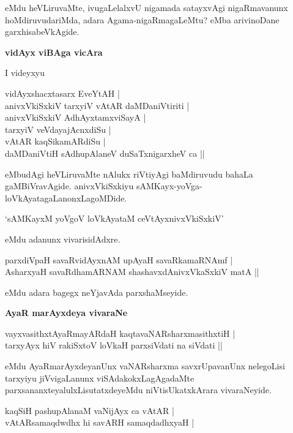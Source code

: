 \noindent
eMdu heVLiruvaMte, ivugaLelalxvU nigamada satayxvAgi nigaRmavanunx hoMdiruvudariMda, adara Agama-nigaRmagaLeMtu? eMba arivinoDane garxhisabeVkAgide.

\newpage

{\bigskip
\noindent
{\large\bf vidAyx viBAga vicAra}}\label{page89a}
\medskip

\noindent
I videyxyu 

\begin{shloka}
vidAyxshacxtasarx EveYtAH |\\
anivxVkiSxkiV tarxyiV vAtAR daMDaniVtiriti |\\
anivxVkiSxkiV AdhAyxtamxviSayA |\\\label{89}
tarxyiV veVdayajAcnxdiSu |\\
vAtAR kaqSikamARdiSu |\\
daMDaniVtiH sAdhupAlaneV duSaTxnigarxheV ca ||
\end{shloka}

\noindent
eMbudAgi heVLiruvaMte nAlukx riVtiyAgi baMdiruvudu bahaLa gaMBiVravAgide. anivxVkiSxkiyu sAMKayx-yoVga-loVkAyatagaLanonxLagoMDide.

\begin{shloka}
`sAMKayxM yoVgoV loVkAyataM ceVtAyxnivxVkiSxkiV'\label{89a}
\end{shloka}

\noindent
eMdu adanunx vivarisidAdxre.

\begin{shloka}
parxdiVpaH savaRvidAyxnAM upAyaH savaRkamaRNAmf |\\\label{89b}
AsharxyaH savaRdhamARNAM shashavxdAnivxVkaSxkiV matA ||
\end{shloka}

\noindent
eMdu adara bagegx neYjavAda parxshaMseyide.

{\bigskip
\noindent
{\large\bf AyaR marAyxdeya vivaraNe}}\label{page90}
\medskip

\begin{shloka}
vayxvasithxtAyaRmayARdaH kaqtavaNARsharxmasithxtiH |\\\label{90}
tarxyAyx hiV rakiSxtoV  loVkaH parxsiVdati na siVdati ||
\end{shloka}

\noindent
eMdu AyaRmarAyxdeyanUnx vaNARsharxma savxrUpavanUnx nelegoLisi tarxyiyu jiVvigaLanunx viSAdakokxLagAgadaMte parxsananxteyalulxLisutatxdeyeMdu niVtisUkatxkArara vivaraNeyide.

\begin{shloka}
kaqSiH pashupAlanaM vaNijAyx ca vAtAR |\\\label{90a}
vAtARsamaqdwdhx hi savARH samaqdadhxyaH |\label{90b}
\end{shloka}

